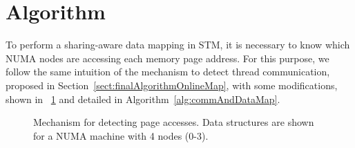 \section{Algorithm}
To perform a sharing-aware data mapping in STM, it is necessary to know which NUMA nodes are accessing each memory page address. For this purpose, we follow the same intuition of the mechanism to detect thread communication, proposed in Section~\ref{sect:finalAlgorithmOnlineMap}, with some modifications, shown in \figurename~\ref{fig:mechanismDataMapping} and detailed in Algorithm~\ref{alg:commAndDataMap}.
\begin{figure}[!ht]
	\centering
	\caption{Mechanism for detecting page accesses. Data structures are shown for a NUMA machine with 4 nodes (0-3).}
	\label{fig:mechanismDataMapping}
\end{figure}

